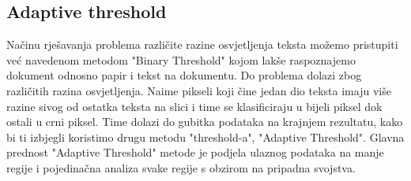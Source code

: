 \documentclass[times, utf8, zavrsni, numeric]{fer}
\begin{document}
\subsection{Adaptive threshold}
Načinu rješavanja problema različite razine osvjetljenja teksta možemo pristupiti već navedenom metodom "Binary Threshold" kojom lakše raspoznajemo dokument odnosno papir i tekst na dokumentu. Do problema dolazi zbog različitih razina osvjetljenja. Naime pikseli koji čine jedan dio teksta imaju više razine sivog od ostatka teksta na slici i time se klasificiraju u bijeli piksel dok ostali u crni piksel. Time dolazi do gubitka podataka na krajnjem rezultatu, kako bi ti izbjegli koristimo drugu metodu "threshold-a", "Adaptive Threshold"\cite{OpenCVadaptive}. Glavna prednost "Adaptive Threshold" metode je podjela ulaznog podataka na manje regije i pojedinačna analiza svake regije s obzirom na pripadna svojstva.
\end{document}
